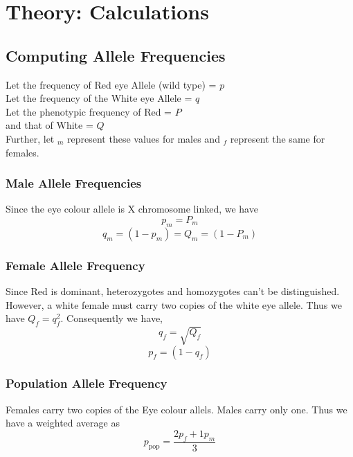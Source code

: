 \section{Theory: Calculations}
	\subsection{Computing Allele Frequencies}
		Let the frequency of Red eye Allele (wild type) = $p$\\
		Let the frequency of the White eye Allele = $q$\\
		Let the phenotypic frequency of Red = $P$\\
		and that of White = $Q$\\
		Further, let $_m$ represent these values for males and $_f$ represent the same for females.
		\subsubsection{Male Allele Frequencies}
			Since the eye colour allele is X chromosome linked, we have
			\begin{equation}
				p_m=P_m
			\end{equation}
			\begin{equation}
				q_m=(1-p_m)=Q_m=(1-P_m)
			\end{equation}

		\subsubsection{Female Allele Frequency}
			Since Red is dominant, heterozygotes and homozygotes can't be distinguished. However, a white female must carry two copies of the white eye allele. Thus we have $Q_f=q_f^2$. Consequently we have,
			\begin{equation}
				q_f=\sqrt{Q_f}
			\end{equation}
			\begin{equation}
				p_f=(1-q_f)
			\end{equation}
		\subsubsection{Population Allele Frequency}
			Females carry two copies of the Eye colour allels. Males carry only one. Thus we have a weighted average as
			\begin{equation}
				p_\text{pop}=\frac{2p_f + 1p_m}{3}
			\end{equation}

